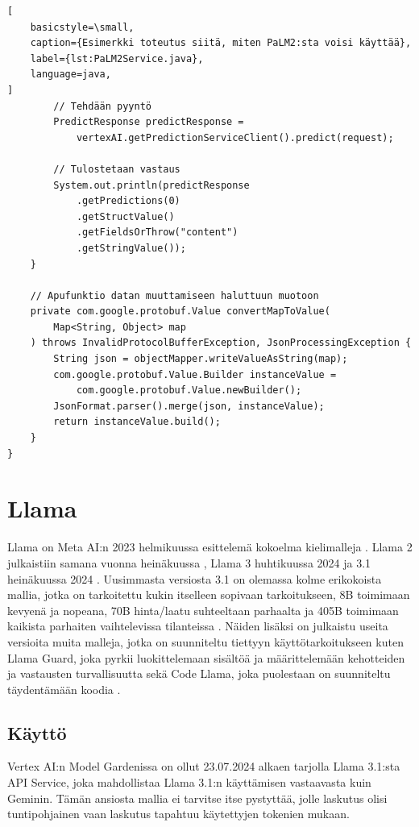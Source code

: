 \begin{lstlisting}[
    basicstyle=\small,
    caption={Esimerkki toteutus siitä, miten PaLM2:sta voisi käyttää},
    label={lst:PaLM2Service.java},
    language=java,
]
        // Tehdään pyyntö
        PredictResponse predictResponse =
            vertexAI.getPredictionServiceClient().predict(request);

        // Tulostetaan vastaus
        System.out.println(predictResponse
            .getPredictions(0)
            .getStructValue()
            .getFieldsOrThrow("content")
            .getStringValue());
    }

    // Apufunktio datan muuttamiseen haluttuun muotoon
    private com.google.protobuf.Value convertMapToValue(
        Map<String, Object> map
    ) throws InvalidProtocolBufferException, JsonProcessingException {
        String json = objectMapper.writeValueAsString(map);
        com.google.protobuf.Value.Builder instanceValue =
            com.google.protobuf.Value.newBuilder();
        JsonFormat.parser().merge(json, instanceValue);
        return instanceValue.build();
    }
}
\end{lstlisting}

\section{Llama}

Llama on Meta AI:n 2023 helmikuussa esittelemä kokoelma kielimalleja
\parencite{llama1}. Llama 2 julkaistiin samana vuonna heinäkuussa
\parencite{llama2}, Llama 3 huhtikuussa 2024 \parencite{llama3} ja 3.1
heinäkuussa 2024 \parencite{llama31}. Uusimmasta versiosta 3.1 on olemassa
kolme erikokoista mallia, jotka on tarkoitettu kukin itselleen sopivaan
tarkoitukseen, 8B toimimaan kevyenä ja nopeana, 70B hinta/laatu suhteeltaan
parhaalta ja 405B toimimaan kaikista parhaiten vaihtelevissa tilanteissa
\parencite{llama}. Näiden lisäksi on julkaistu useita versioita muita malleja,
jotka on suunniteltu tiettyyn käyttötarkoitukseen kuten Llama Guard, joka
pyrkii luokittelemaan sisältöä ja määrittelemään kehotteiden ja vastausten
turvallisuutta \parencite{llamaGuard3} sekä Code Llama, joka puolestaan on
suunniteltu täydentämään koodia \parencite{llamaOtherModels}.

\subsection{Käyttö}

Vertex AI:n Model Gardenissa on ollut 23.07.2024 alkaen tarjolla Llama 3.1:sta
API Service, joka mahdollistaa Llama 3.1:n käyttämisen vastaavasta kuin
Geminin. Tämän ansiosta mallia ei tarvitse itse pystyttää, jolle laskutus olisi
tuntipohjainen vaan laskutus tapahtuu käytettyjen tokenien mukaan.
\parencite{vertexAiModelGardenLlama3}

